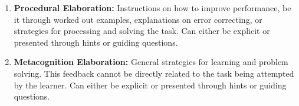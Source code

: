 \begin{enumerate}[label=\textbf{\arabic*.}]
\item \textbf{Procedural Elaboration:} Instructions on how to improve performance, be it through worked out examples, explanations on error correcting, or strategies for processing and solving the task. Can either be explicit or presented through hints or guiding questions.

\item \textbf{Metacognition Elaboration:} General strategies for learning and problem solving. This feedback cannot be directly related to the task being attempted by the learner. Can either be explicit or presented through hints or guiding questions.

\end{enumerate}
